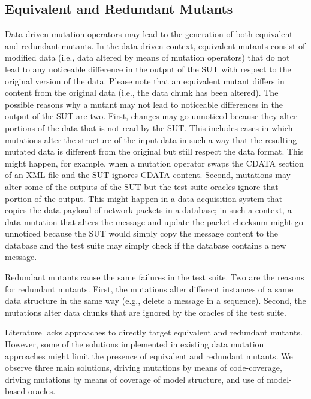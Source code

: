 
\subsection{Equivalent and Redundant Mutants}
\label{sec:dataequivalent}

Data-driven mutation operators may lead to the generation of both equivalent and redundant mutants.
In the data-driven context, equivalent mutants consist of modified data (i.e., data altered by means of mutation operators) that do not lead to any noticeable difference in the output of the SUT with respect to the original version of the data.
Please note that an equivalent mutant differs in content from the original data (i.e., the data chunk has been altered).
The possible reasons why a mutant may not lead to noticeable differences in the output of the SUT are two. First, changes may go unnoticed because they alter portions of the data that is not read by the SUT. This includes cases in which mutations alter the structure of the input data in such a way that the resulting mutated data is different from the original but still respect the data format. This might happen, for example, when a mutation operator swaps the CDATA section of an XML file and the SUT ignores CDATA content. Second, mutations may alter some of the outputs of the SUT but the test suite oracles ignore that portion of the output. This might happen in a data acquisition system that copies the data payload of network packets in a database; in such a context, a data mutation that alters the message and update the packet checksum might go unnoticed because the SUT would simply copy the message content to the database and the test suite may simply check if the database contains a new message.

Redundant mutants cause the same failures in the test suite. Two are the reasons for redundant mutants. First, the mutations alter different instances of a same data structure in the same way (e.g., delete a message in a sequence). Second, the mutations alter data chunks that are ignored by the oracles of the test suite.

Literature lacks approaches to directly target equivalent and redundant mutants. However, some of the solutions implemented in existing data mutation approaches might limit the presence of equivalent and redundant mutants. We observe three main solutions, driving mutations by means of code-coverage, driving mutations by means of coverage of model structure, and use of model-based oracles.

